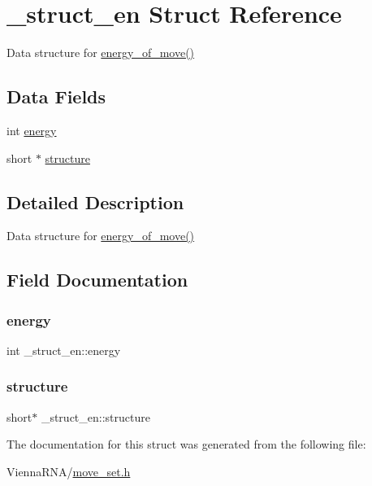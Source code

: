 \hypertarget{struct__struct__en}{}\section{\+\_\+struct\+\_\+en Struct Reference}
\label{struct__struct__en}


Data structure for \mbox{\hyperlink{group__eval_ga539ecaed89730f7644c202f304d7529b}{energy\+\_\+of\+\_\+move()}}  


\subsection*{Data Fields}
\begin{DoxyCompactItemize}
\item 
int \mbox{\hyperlink{struct__struct__en_aeecd2b2f343cfd8ec022a2a215076170}{energy}}
\item 
short $\ast$ \mbox{\hyperlink{struct__struct__en_afb76234a4e65aef644eeabcd57b77b86}{structure}}
\end{DoxyCompactItemize}


\subsection{Detailed Description}
Data structure for \mbox{\hyperlink{group__eval_ga539ecaed89730f7644c202f304d7529b}{energy\+\_\+of\+\_\+move()}} 

\subsection{Field Documentation}
\mbox{\label{struct__struct__en_aeecd2b2f343cfd8ec022a2a215076170}} 
\subsubsection{\texorpdfstring{energy}{energy}}
{\footnotesize\ttfamily int \+\_\+struct\+\_\+en\+::energy}

\mbox{\label{struct__struct__en_afb76234a4e65aef644eeabcd57b77b86}} 
\subsubsection{\texorpdfstring{structure}{structure}}
{\footnotesize\ttfamily short$\ast$ \+\_\+struct\+\_\+en\+::structure}



The documentation for this struct was generated from the following file\+:\begin{DoxyCompactItemize}
\item 
Vienna\+R\+N\+A/\mbox{\hyperlink{move__set_8h}{move\+\_\+set.\+h}}\end{DoxyCompactItemize}
